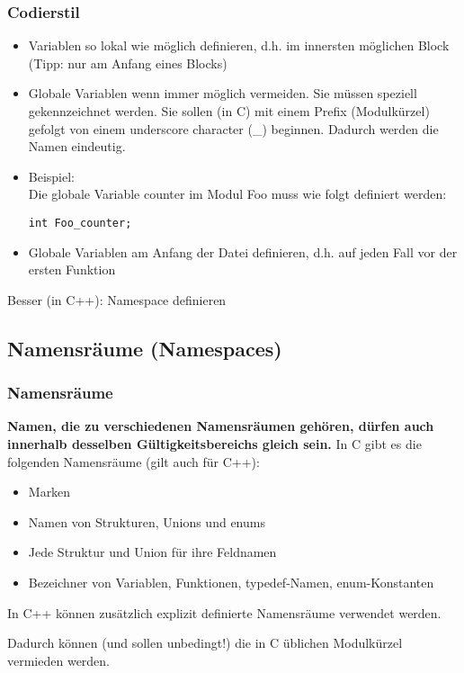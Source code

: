 \subsubsection{Codierstil\hfill}
\label{sec:unterunterabschnitt}
\begin{itemize}
	\item Variablen so lokal wie möglich definieren, d.h. im innersten möglichen Block (Tipp: nur am Anfang eines Blocks)
	\item Globale Variablen wenn immer möglich vermeiden. Sie müssen speziell gekennzeichnet werden. Sie sollen (in C) mit einem Prefix (Modulkürzel) gefolgt von einem underscore character (\_) beginnen. Dadurch werden die Namen eindeutig.
	\item[\-] Beispiel:\\Die globale Variable counter im Modul Foo muss wie folgt definiert werden:
	\noindent
\begin{minipage}{\linewidth}
\begin{lstlisting}
int Foo_counter;
\end{lstlisting}
\end{minipage}
	\item Globale Variablen am Anfang der Datei definieren, d.h. auf jeden Fall vor der ersten Funktion
\end{itemize}
\begin{hinweis}
Besser (in C++): Namespace definieren
\end{hinweis}


\subsection{Namensräume (Namespaces)\hfill}
\label{sec:unterabschnitt}

\subsubsection{Namensräume\hfill}
\label{sec:unterunterabschnitt}
\textbf{Namen, die zu verschiedenen Namensräumen gehören, dürfen auch innerhalb desselben Gültigkeitsbereichs gleich sein.}
In C gibt es die folgenden Namensräume (gilt auch für C++):
\begin{itemize}
	\item Marken
	\item Namen von Strukturen, Unions und enums
	\item Jede Struktur und Union für ihre Feldnamen
	\item Bezeichner von Variablen, Funktionen, typedef-Namen, enum-Konstanten
\end{itemize}
In C++ können zusätzlich explizit definierte Namensräume verwendet werden.\\
\begin{hinweis}
Dadurch können (und sollen unbedingt!) die in C üblichen Modulkürzel vermieden werden.
\end{hinweis}

